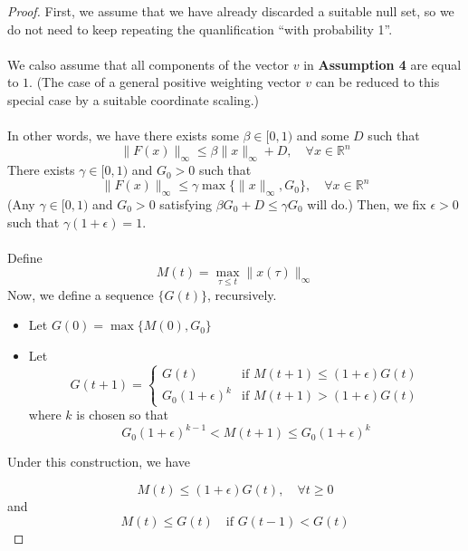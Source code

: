 \begin{proof}
First, we assume that we have already discarded a suitable null set, so we do not need to keep repeating the quanlification ``with probability 1''.\\
\\
We calso assume that all components of the vector $v$ in \textbf{Assumption 4} are equal to $1$. (The case of a general positive weighting vector $v$ can be reduced to this special case by a suitable coordinate scaling.)\\
\\
In other words, we have there exists some $\beta\in [0,1)$ and some $D$ such that 
$$
\|F(x)\|_\infty \le \beta\|x\|_\infty  + D,\quad \forall x\in\mathbb{R}^n
$$
There exists $\gamma\in[0,1)$ and $G_0>0$ such that
\begin{equation}\label{eq:Fandgamma}
    \|F(x)\|_\infty  \le \gamma \max\{\|x\|_\infty, G_0\},\quad\forall x\in\mathbb{R}^n
\end{equation}
(Any $\gamma\in[0,1)$ and $G_0>0$ satisfying $\beta G_0+D\le \gamma G_0$ will do.) Then, we fix $\epsilon>0$ such that $\gamma(1+\epsilon)=1$.\\
\\
Define
\begin{equation}\label{eq:M(t)}
    M(t) = \max_{\tau\le t} \|x(\tau)\|_\infty 
\end{equation}
Now, we define a sequence $\{G(t)\}$, recursively. 
\begin{itemize}
    \item Let $G(0) = \max\{M(0), G_0\}$
    \item Let 
    \begin{equation}\label{eq:updateruleofG}
           G(t+1) = \begin{cases}
        G(t) & \text{if $M(t+1)\le (1+\epsilon)G(t)$}\\
        G_0(1+\epsilon)^k &\text{if $M(t+1)>(1+\epsilon)G(t)$}
    \end{cases} 
    \end{equation}
    where $k$ is chosen so that 
    $$
    G_0(1+\epsilon)^{k-1}<M(t+1) \le G_0(1+\epsilon)^k
    $$
\end{itemize}
Under this construction, we have

\begin{equation}\label{eq:MtandGt}
    M(t)\le (1+\epsilon)G(t),\quad \forall t\ge 0
\end{equation}
and
\begin{equation}\label{eq:MtandGt2}
    M(t)\le G(t)\quad \text{if $G(t-1)<G(t)$}
\end{equation}


\end{proof}
